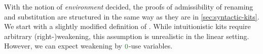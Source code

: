 With the notion of \emph{environment} decided, the proofs of admissibility of
renaming and substitution are structured in the same way as they are in
\autoref{sec:syntactic-kits}.
We start with a slightly modified definition of .
While intuitionistic kits require arbitrary (right-)weakening, this assumption
is unrealistic in the linear setting.
However, we can expect weakening by $\gr0$-use variables.


